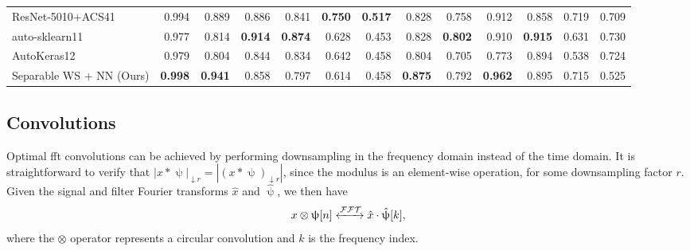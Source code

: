 \documentclass[journal]{IEEEtran}
\begin{document}
\begin{table*}[t!]
\begin{tabular}{|l|rr|rr|rr|rr|rr|rr|}
ResNet-5010+ACS41       & 0.994                   & 0.889                   & 0.886                   & 0.841                   & \textbf{0.750}           & \textbf{0.517}          & 0.828                   & 0.758                   & 0.912                   & 0.858                   & 0.719                   & 0.709                   \\
auto-sklearn11          & 0.977                   & 0.814                   & \textbf{0.914}          & \textbf{0.874}          & 0.628                   & 0.453                   & 0.828                   & \textbf{0.802}          & 0.910                   & \textbf{0.915}          & 0.631                   & 0.730                    \\
AutoKeras12             & 0.979                   & 0.804                   & 0.844                   & 0.834                   & 0.642                   & 0.458                   & 0.804                   & 0.705                   & 0.773                   & 0.894                   & 0.538                   & 0.724                   \\ \hline
Separable WS + NN (Ours)  & \textbf{0.998}          & \textbf{0.941}          & 0.858                   & 0.797                   & 0.614                   & 0.458                   & \textbf{0.875}          & 0.792                   & \textbf{0.962}          & 0.895                   & 0.715                   & 0.525    \\ \hline              
\end{tabular}
\end{table*}

\subsection{Convolutions}
Optimal \ac{fft} convolutions can be achieved by performing downsampling in the frequency domain instead of the time domain. It is straightforward to verify that $|x * \uppsi|_{\downarrow r} = \left|(x * \uppsi)_{\downarrow r}\right|$, since the modulus is an element-wise operation, for some downsampling factor $r$. Given the signal and filter Fourier transforms $\hat{x}$ and $\hat{\uppsi}$, we then have
\begin{equation}
\label{eqn:circconv}
    x \otimes \uppsi [n] \xleftrightarrow{\mathcal{FFT}}  \hat{x} \cdot \hat{\uppsi} [k],
\end{equation}
where the $\otimes$ operator represents a circular convolution and $k$ is the frequency index.
\end{document}
